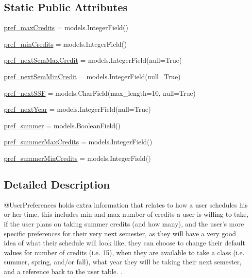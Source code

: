 \subsection*{Static Public Attributes}
\begin{DoxyCompactItemize}
\item 
\mbox{\hyperlink{classmavAgenda_1_1landing_1_1models_1_1UserPreferences_a8d47e9822009931e352a2b13f381ea75}{pref\+\_\+max\+Credits}} = models.\+Integer\+Field()
\item 
\mbox{\hyperlink{classmavAgenda_1_1landing_1_1models_1_1UserPreferences_ab49732a171d5af3a02d1b59d5ba1afe7}{pref\+\_\+min\+Credits}} = models.\+Integer\+Field()
\item 
\mbox{\hyperlink{classmavAgenda_1_1landing_1_1models_1_1UserPreferences_a7072c0430d46a83f89fc31ee20110abc}{pref\+\_\+next\+Sem\+Max\+Credit}} = models.\+Integer\+Field(null=True)
\item 
\mbox{\hyperlink{classmavAgenda_1_1landing_1_1models_1_1UserPreferences_a4586266c541b0347f1cbf7cfc092a5fd}{pref\+\_\+next\+Sem\+Min\+Credit}} = models.\+Integer\+Field(null=True)
\item 
\mbox{\hyperlink{classmavAgenda_1_1landing_1_1models_1_1UserPreferences_ae87025b39c48befc2294e628fe73fcc0}{pref\+\_\+next\+S\+SF}} = models.\+Char\+Field(max\+\_\+length=10, null=True)
\item 
\mbox{\hyperlink{classmavAgenda_1_1landing_1_1models_1_1UserPreferences_a4755a6a2f9f715b91328749cf51b7e2a}{pref\+\_\+next\+Year}} = models.\+Integer\+Field(null=True)
\item 
\mbox{\hyperlink{classmavAgenda_1_1landing_1_1models_1_1UserPreferences_a3925629b27b68fe1fb60ec99cfe4666b}{pref\+\_\+summer}} = models.\+Boolean\+Field()
\item 
\mbox{\hyperlink{classmavAgenda_1_1landing_1_1models_1_1UserPreferences_a01ea4111daa45705c3d3170a7be0a3f7}{pref\+\_\+summer\+Max\+Credits}} = models.\+Integer\+Field()
\item 
\mbox{\hyperlink{classmavAgenda_1_1landing_1_1models_1_1UserPreferences_af6efbf20f86d3d38b2f12bc4e21b3b25}{pref\+\_\+summer\+Min\+Credits}} = models.\+Integer\+Field()
\end{DoxyCompactItemize}


\subsection{Detailed Description}
\begin{DoxyVerb}@UserPreferences  holds extra information that relates to how a
        user schedules his or her time, this includes
        min and max number of credits a user is willing to take,
        if the user plans on taking summer credits (and how many),
        and the user's more specific preferences for their very next
        semester, as they will have a very good idea of what their schedule
        will look like, they can choose to change their default values for
        number of credits (i.e. 15), when they are available to take a class (i.e. summer, spring, and/or fall),
        what year they will be taking their next semester, and a reference back to the user table.               .
\end{DoxyVerb}
 

